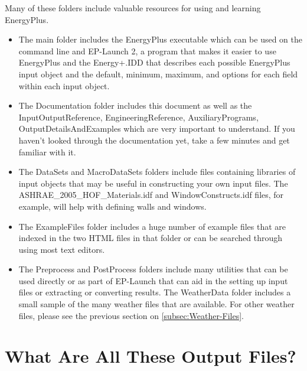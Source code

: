 Many of these folders include valuable resources for using and learning
EnergyPlus. 
\begin{itemize}
\item The main folder includes the EnergyPlus executable which can be used
on the command line and EP-Launch 2, a program that makes it easier
to use EnergyPlus and the Energy+.IDD that describes each possible
EnergyPlus input object and the default, minimum, maximum, and options
for each field within each input object. 
\item The Documentation folder includes this document as well as the InputOutputReference,
EngineeringReference, AuxiliaryPrograms, OutputDetailsAndExamples
which are very important to understand. If you haven't looked through
the documentation yet, take a few minutes and get familiar with it. 
\item The DataSets and MacroDataSets folders include files containing libraries
of input objects that may be useful in constructing your own input
files. The ASHRAE\_2005\_HOF\_Materials.idf and WindowConstructs.idf
files, for example, will help with defining walls and windows. 
\item The ExampleFiles folder includes a huge number of example files that
are indexed in the two HTML files in that folder or can be searched
through using most text editors. 
\item The Preprocess and PostProcess folders include many utilities that
can be used directly or as part of EP-Launch that can aid in the setting
up input files or extracting or converting results. The WeatherData
folder includes a small sample of the many weather files that are
available. For other weather files, please see the previous section
on \ref{subsec:Weather-Files}. 
\end{itemize}

\section{What Are All These Output Files?}

